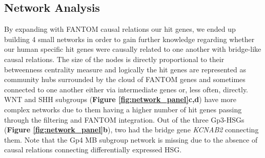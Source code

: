 \documentclass[10pt]{SelfArx} %
\begin{document}
\subsection{Network Analysis}\label{sec:network_results}
By expanding with FANTOM \cite{fantom5} causal relations our hit genes, we ended up building 4 small networks in order to gain further knowledge regarding whether our human specific hit genes were causally related to one another with bridge-like causal relations. The size of the nodes is directly proportional to their betweenness centrality measure and logically the hit genes are represented as community hubs surrounded by the cloud of FANTOM \cite{fantom5} genes and sometimes connected to one another either via intermediate genes or, less often, directly.\\
WNT and SHH subgroups (\textbf{Figure \ref{fig:network_panel}c,d}) have more complex networks due to them having a higher number of hit genes passing through the filtering and FANTOM \cite{fantom5} integration. Out of the three Gp3-HSGs (\textbf{Figure \ref{fig:network_panel}b}), two had the bridge gene \textit{KCNAB2} connecting them. Note that the Gp4 MB subgroup network is missing due to the absence of causal relations connecting differentially expressed HSG.
\end{document}
